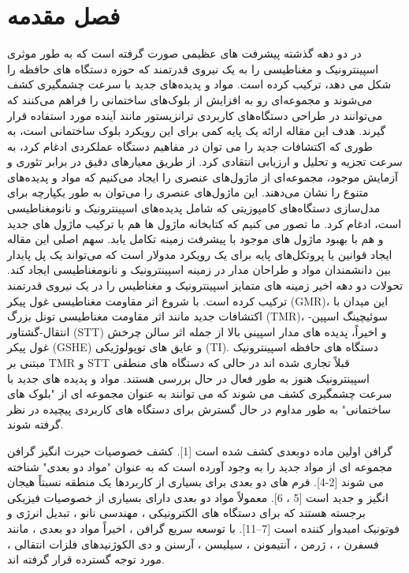 ﻿\chapter{فصل مقدمه} 
\newpage
در دو دهه گذشته پیشرفت های عظیمی صورت گرفته است که به طور موثری اسپینترونیک و مغناطیسی را به یک نیروی قدرتمند که حوزه دستگاه های حافظه را شکل می دهد، ترکیب کرده است. مواد و پدیده‌های جدید با سرعت چشمگیری کشف می‌شوند و مجموعه‌ای رو به افزایش از بلوک‌های ساختمانی را فراهم می‌کنند که می‌توانند در طراحی دستگاه‌های کاربردی ترانزیستور مانند آینده مورد استفاده قرار گیرند. هدف این مقاله ارائه یک پایه کمی برای این رویکرد بلوک ساختمانی است، به طوری که اکتشافات جدید را می توان در مفاهیم دستگاه عملکردی ادغام کرد، به سرعت تجزیه و تحلیل و ارزیابی انتقادی کرد. از طریق معیارهای دقیق در برابر تئوری و آزمایش موجود، مجموعه‌ای از ماژول‌های عنصری را ایجاد می‌کنیم که مواد و پدیده‌های متنوع را نشان می‌دهند. این ماژول‌های عنصری را می‌توان به طور یکپارچه برای مدل‌سازی دستگاه‌های کامپوزیتی که شامل پدیده‌های اسپینترونیک و نانومغناطیسی است، ادغام کرد. ما تصور می کنیم که کتابخانه ماژول ها هم با ترکیب ماژول های جدید و هم با بهبود ماژول های موجود با پیشرفت زمینه تکامل یابد. سهم اصلی این مقاله ایجاد قوانین یا پروتکل‌های پایه برای یک رویکرد مدولار است که می‌تواند یک پل پایدار بین دانشمندان مواد و طراحان مدار در زمینه اسپینترونیک و نانومغناطیسی ایجاد کند.
تحولات دو دهه اخیر زمینه های متمایز اسپینترونیک و مغناطیس را در یک نیروی قدرتمند ترکیب کرده است. با شروع اثر مقاومت مغناطیسی غول پیکر (GMR)، این میدان با اکتشافات جدید مانند اثر مقاومت مغناطیسی تونل بزرگ (TMR)، سوئیچینگ اسپین-انتقال-گشتاور (STT) و اخیراً، پدیده های مدار اسپینی بالا از جمله اثر سالن چرخش غول پیکر (GSHE) و عایق های توپولوژیکی (TI).
دستگاه های حافظه اسپینترونیک مبتنی بر TMR و STT قبلاً تجاری شده اند در حالی که دستگاه های منطقی اسپینترونیک هنوز به طور فعال در حال بررسی هستند. مواد و پدیده های جدید با سرعت چشمگیری کشف می شوند که می توانند به عنوان مجموعه ای از "بلوک های ساختمانی" به طور مداوم در حال گسترش برای دستگاه های کاربردی پیچیده در نظر گرفته شوند.

گرافن اولین ماده دوبعدی کشف شده است [1]. کشف خصوصیات حیرت انگیز گرافن مجموعه ای از مواد جدید را به وجود آورده است که به عنوان "مواد دو بعدی" شناخته می شوند [2-4]. فرم های دو بعدی برای بسیاری از کاربردها یک منطقه نسبتاً هیجان انگیز و جدید است [5 ، 6]. معمولاً مواد دو بعدی دارای بسیاری از خصوصیات فیزیکی برجسته هستند که برای دستگاه های الکترونیکی ، مهندسی نانو ، تبدیل انرژی و فوتونیک امیدوار کننده است [7–11]. با توسعه سریع گرافن ، اخیراً مواد دو بعدی ، مانند فسفرن ، 
 ، ژرمن ، آنتیمونن ، سیلیسن ، آرسنن و دی الكوژنیدهای فلزات انتقالی ، مورد توجه گسترده قرار گرفته اند.

